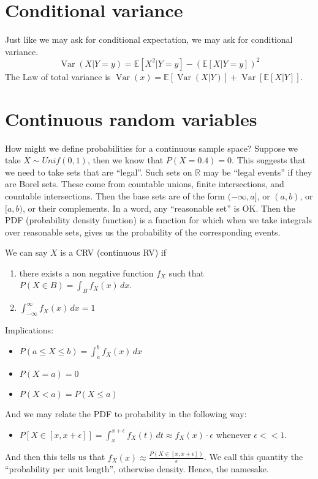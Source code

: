 \documentclass{article}
\newcommand{\R}{\mathbb R}
\newcommand{\E}{\mathbb E}
\DeclareMathOperator{\Var}{Var}
\theoremstyle{remark}
\theoremstyle{definition}
\newtheorem{definition}{Definition}[section]
\begin{document}
\section*{Conditional variance}
Just like we may ask for conditional expectation, we may ask for conditional variance.
\begin{equation*}
    \Var(X|Y=y) = \E[X^2 | Y=y] - (\E[X|Y=y])^2
\end{equation*}
The Law of total variance is $\Var(x) = \E[\Var(X|Y)] + \Var[\E[X|Y]]$.

\section*{Continuous random variables}
How might we define probabilities for a continuous sample space?
Suppose we take $X\sim Unif(0,1)$, then we know that $P(X = 0.4) = 0$.
This suggests that we need to take sets that are ``legal''.
Such sets on $\R$ may be ``legal events'' if they are Borel sets.
These come from countable unions, finite intersections, and countable intersections.
Then the base sets are of the form $(-\infty, a]$, or $(a,b)$, or $[a, b)$, or their complements.
In a word, any ``reasonable set'' is OK. %
Then the PDF (probability density function) is a function for which when we take integrals over reasonable sets, gives us the probability of the corresponding events.

We can say $X$ is a CRV (continuous RV) if 
\begin{enumerate}
    \item there exists a non negative function $f_X$ such that $P(X\in B) = \int_B f_X(x) \, dx$.
    \item $\int_{-\infty}^\infty f_X(x) \, dx = 1$
\end{enumerate}
Implications:
\begin{itemize}
    \item $P(a \leq X \leq b) = \int_a^b f_X(x) \, dx $
    \item $P(X=a) = 0$
    \item $P(X<a) = P(X \leq a)$
\end{itemize}

And we may relate the PDF to probability in the following way:
\begin{itemize}
    \item $P[X\in[x, x+\epsilon]] = \int_x^{x+\epsilon} f_X(t) \, dt \approx f_X(x) \cdot \epsilon$ whenever $\epsilon << 1$. 
\end{itemize}
And then this tells us that $f_X(x) \approx \frac{P(X\in [x, x+\epsilon])}{\epsilon}$.
We call this quantity the ``probability per unit length'', otherwise density. 
Hence, the namesake.
\end{document}
